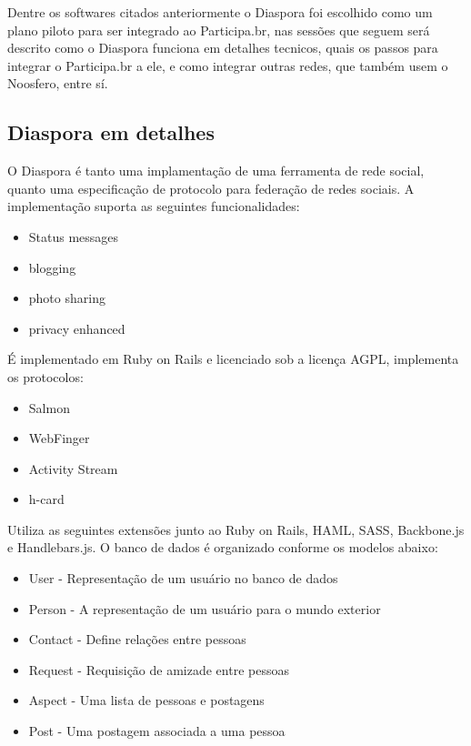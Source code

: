 \documentclass[12pt]{article}
\begin{document}
Dentre os softwares citados anteriormente o Diaspora foi escolhido como um
plano piloto para ser integrado ao Participa.br, nas sessões que seguem será
descrito como o Diaspora funciona em detalhes tecnicos, quais os passos para
integrar o Participa.br a ele, e como integrar outras redes, que também usem
o Noosfero, entre sí.

\subsection{Diaspora em detalhes}


O Diaspora é tanto uma implamentação de uma ferramenta de rede social, quanto
uma especificação de protocolo para federação de redes sociais.
A implementação suporta as seguintes funcionalidades:

\begin{itemize}
  \item Status messages
  \item blogging
  \item photo sharing
  \item privacy enhanced
\end{itemize}

É implementado em Ruby on Rails e licenciado sob a licença
AGPL, implementa os protocolos:

\begin{itemize}
  \item Salmon
  \item WebFinger
  \item Activity Stream
  \item h-card
\end{itemize}

Utiliza as seguintes extensões junto ao Ruby on Rails, HAML, SASS, Backbone.js
e Handlebars.js. O banco de dados é organizado conforme os modelos abaixo:

\begin{itemize}
  \item User - Representação de um usuário no banco de dados
  \item Person - A representação de um usuário para o mundo exterior
  \item Contact - Define relações entre pessoas
  \item Request - Requisição de amizade entre pessoas
  \item Aspect - Uma lista de pessoas e postagens
  \item Post - Uma postagem associada a uma pessoa
\end{itemize}
\end{document}
